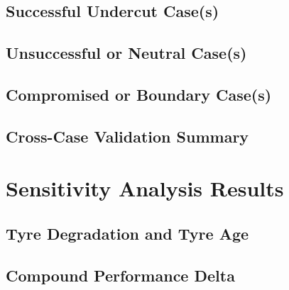 \subsection{Successful Undercut Case(s)}

\subsection{Unsuccessful or Neutral Case(s)}

\subsection{Compromised or Boundary Case(s)}

\subsection{Cross-Case Validation Summary}

\section{Sensitivity Analysis Results}
\label{sec:sensitivity-results}


\subsection{Tyre Degradation and Tyre Age}

\subsection{Compound Performance Delta}

